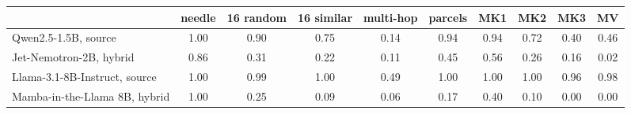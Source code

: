 \begin{tabular}{lccccccccc}
\toprule
 & needle & 16 random & 16 similar & multi-hop & parcels & MK1 & MK2 & MK3 & MV \\
\midrule
Qwen2.5-1.5B, source & 1.00 & 0.90 & 0.75 & 0.14 & 0.94 & 0.94 & 0.72 & 0.40 & 0.46 \\
Jet-Nemotron-2B, hybrid & 0.86 & 0.31 & 0.22 & 0.11 & 0.45 & 0.56 & 0.26 & 0.16 & 0.02 \\
\addlinespace
Llama-3.1-8B-Instruct, source & 1.00 & 0.99 & 1.00 & 0.49 & 1.00 & 1.00 & 1.00 & 0.96 & 0.98 \\
Mamba-in-the-Llama 8B, hybrid & 1.00 & 0.25 & 0.09 & 0.06 & 0.17 & 0.40 & 0.10 & 0.00 & 0.00 \\
\bottomrule
\end{tabular}
